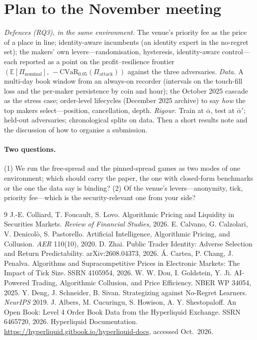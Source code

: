 \documentclass[10pt]{article}
\begin{document}
\section{Plan to the November meeting}
\emph{Defences (RQ3), in the same environment.} The venue's priority fee as the price of a place in line; identity-aware incumbents (an identity expert in the no-regret set); the makers' own levers---randomisation, hysteresis, identity-aware control---each reported as a point on the profit--resilience frontier $(\mathbb{E}[\Pi_{\mathrm{nominal}}],\,-\mathrm{CVaR}_{0.05}(\Pi_{\mathrm{attack}}))$ against the three adversaries. \emph{Data.} A multi-day book window from an always-on recorder (intervals on the touch-fill loss and the per-maker persistence by coin and hour); the October 2025 cascade as the stress case; order-level lifecycles (December 2025 archive) to say \emph{how} the top makers select---position, cancellation, depth. \emph{Rigour.} Train at $\bar\alpha$, test at $\bar\alpha'$; held-out adversaries; chronological splits on data. Then a short results note and the discussion of how to organise a submission.

\paragraph{Two questions.} (1) We run the free-spread and the pinned-spread games as two modes of one environment; which should carry the paper, the one with closed-form benchmarks or the one the data say is binding? (2) Of the venue's levers---anonymity, tick, priority fee---which is the security-relevant one from your side?

\begin{thebibliography}{9}\footnotesize
{} J.-E. Colliard, T. Foucault, S. Lovo. Algorithmic Pricing and Liquidity in Securities Markets. \emph{Review of Financial Studies}, 2026.
 E. Calvano, G. Calzolari, V. Denicol\`o, S. Pastorello. Artificial Intelligence, Algorithmic Pricing, and Collusion. \emph{AER} 110(10), 2020.
 D. Zhai. Public Trader Identity: Adverse Selection and Return Predictability. arXiv:2608.04373, 2026.
 \'A. Cartea, P. Chang, J. Penalva. Algorithms and Supracompetitive Prices in Electronic Markets: The Impact of Tick Size. SSRN 4105954, 2026.
 W. W. Dou, I. Goldstein, Y. Ji. AI-Powered Trading, Algorithmic Collusion, and Price Efficiency. NBER WP 34054, 2025.
 Y. Deng, J. Schneider, B. Sivan. Strategizing against No-Regret Learners. \emph{NeurIPS} 2019.
 J. Albers, M. Cucuringu, S. Howison, A. Y. Shestopaloff. An Open Book: Level 4 Order Book Data from the Hyperliquid Exchange. SSRN 6465720, 2026.
 Hyperliquid Documentation. \url{https://hyperliquid.gitbook.io/hyperliquid-docs}, accessed Oct.\ 2026.
\end{thebibliography}
\end{document}
